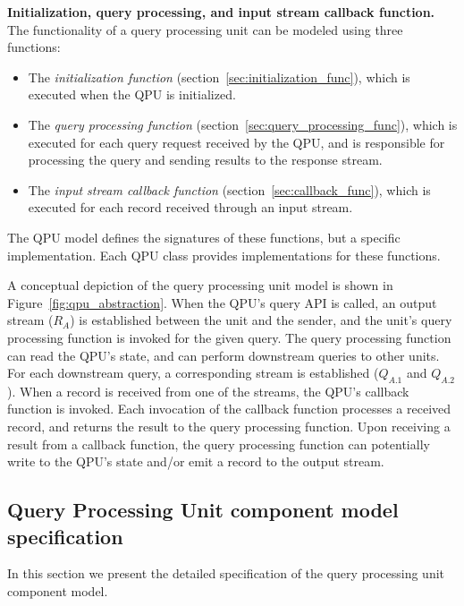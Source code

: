 \medskip
\noindent
\textbf{Initialization, query processing, and input stream callback function.}
The functionality of a query processing unit can be modeled using three functions:
\begin{itemize}
  \item The \textit{initialization function} (section~\ref{sec:initialization_func}), which is executed when the QPU is
  initialized.

  \item The \textit{query processing function} (section~\ref{sec:query_processing_func}), which is executed for each
  query request received by the QPU, and is responsible for processing the query and sending results to the response stream.

  \item The \textit{input stream callback function} (section~\ref{sec:callback_func}), which is executed for each record
  received through an input stream.

\end{itemize}

The QPU model defines the signatures of these functions, but a specific implementation.
Each QPU class provides implementations for these functions.

\bigskip

A conceptual depiction of the query processing unit model is shown in Figure~\ref{fig:qpu_abstraction}.
When the QPU's query API is called, an output stream ($R_A$) is established between the unit and the sender,
and the unit's query processing function is invoked for the given query.
The query processing function can read the QPU's state, and can perform downstream queries to other units.
For each downstream query, a corresponding stream is established ($Q_{A.1}$ and $Q_{A.2}$).
When a record is received from one of the streams, the QPU's callback function is invoked.
Each invocation of the callback function processes a received record, and returns the result to the query processing
function.
Upon receiving a result from a callback function,
the query processing function can potentially write to the QPU's state and/or emit a record to the output stream.


\subsection{Query Processing Unit component model specification}
\label{ref:specification}

In this section we present the detailed specification of the query processing unit component model.


